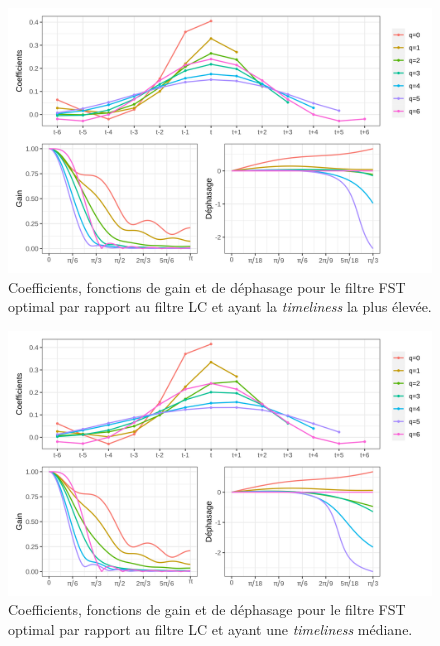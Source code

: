 \documentclass[
  11pt,
  french,
  a4paper]{article}
\newcommand\1{\mathds{1}}
\begin{document}
\begin{figure}[H]

{\centering \includegraphics[width=1\linewidth]{img/filters_used/fst_lc_min} 

}

\caption[Coefficients, fonctions de gain et de déphasage pour le filtre FST optimal par rapport au filtre LC et ayant la \emph{timeliness} la plus élevée]{Coefficients, fonctions de gain et de déphasage pour le filtre FST optimal par rapport au filtre LC et ayant la \emph{timeliness} la plus élevée.}\label{fig:graphsfstlcmin}

\footnotesize
\normalsize\end{figure}

\begin{figure}[H]

{\centering \includegraphics[width=1\linewidth]{img/filters_used/fst_lc_med} 

}

\caption[Coefficients, fonctions de gain et de déphasage pour le filtre FST optimal par rapport au filtre LC et ayant une \emph{timeliness} médiane]{Coefficients, fonctions de gain et de déphasage pour le filtre FST optimal par rapport au filtre LC et ayant une \emph{timeliness} médiane.}\label{fig:graphsfstlcmed}

\footnotesize
\normalsize\end{figure}
\end{document}
